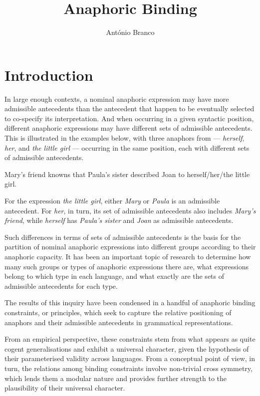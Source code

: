 \documentclass[output=paper
,modfonts
,nonflat]{langsci/langscibook}
\title{Anaphoric Binding}
\author{%
 Ant\'onio Branco\affiliation{University of Lisbon}
}
\begin{document}
\label{chap-binding}

\maketitle
\section{Introduction} 


In large enough contexts, a nominal anaphoric expression may have more
admissible antecedents than the antecedent that happen
to be eventually selected to co-specify its interpretation. 
And when occurring in a given syntactic position, different anaphoric expressions may 
have different sets of admissible antecedents. This is illustrated in the examples 
below, with three anaphors from  --- \textit{herself}, \textit{her},  and \textit{the little girl} --- 
occurring in the same position, each with different sets of admissible antecedents.

\begin{exe}
\ex Mary's friend knowns that Paula's sister described Joan to \linebreak
herself/her/the little girl.
\end{exe}

For the expression \textit{the little girl}, either \textit{Mary} or \textit{Paula} is an admissible antecedent. 
For \textit{her}, in turn, its set of admissible antecedents also includes \textit{Mary's friend}, while
\textit{herself} has \textit{Paula's sister} and \textsl{Joan} as admissible antecedents.

Such differences in terms of sets of admissible antecedents is the basis for 
the partition of nominal anaphoric expressions into different groups according to their anaphoric
capacity. It has been an important topic of research to determine
how many such  groups or types of anaphoric expressions there are, what expressions belong
to which type in each language, and what exactly are the sets of admissible antecedents for each type.

The results of this inquiry have been condensed in a handful of anaphoric 
binding constraints, or principles, which seek to capture the relative positioning of anaphors and their 
admissible antecedents in grammatical representations. 

From an empirical perspective, these constraints stem
from what appears as quite cogent generalisations and exhibit a universal
character, given the hypothesis of their parameterised validity across languages.
From a conceptual point of view, in turn, the relations among binding
constraints involve non-trivial cross symmetry, which lends them a modular nature
and provides further strength to the plausibility of their universal character.%
  
\end{document}
